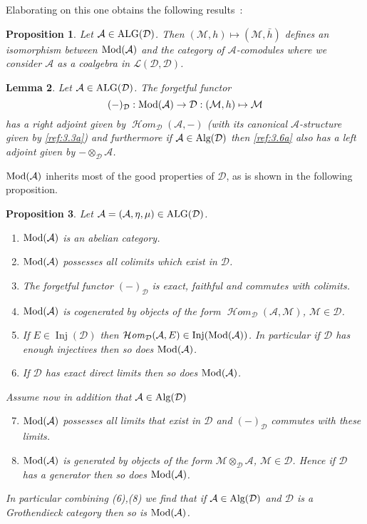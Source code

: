 \documentclass{amsproc}
\def\Ascr{{\mathcal A}}
\def\Dscr{{\mathcal D}}
\def\Hscr{{\mathcal H}}
\def\Lscr{{\mathcal L}}
\def\Mscr{{\mathcal M}}
\def\HHom{\operatorname {\Hscr \mathit{om}}}
\def\Mod{\mathop{\text{Mod}}}
\def\Alg{\mathop{\text{Alg}}}
\def\ALG{\mathop{\text{ALG}}}
\def\Inj{\operatorname {Inj}}
\def\HHom{\operatorname {\Hscr \mathit{om}}}
\def\r{\rightarrow}
\let\oldtext\text
\def\text#1{\oldtext{\upshape #1}}
\newtheorem{lemmas}{Lemma}[subsection]
\newtheorem{propositions}[lemmas]{Proposition}
\theoremstyle{definition}
\theoremstyle{remark}
\numberwithin{equation}{section}
\numberwithin{table}{section}
\numberwithin{figure}{section}
\begin{document}
Elaborating on this one obtains the following results~:
\begin{propositions} Let $\Ascr\in\ALG(\Dscr)$. Then $(\Mscr,h)\mapsto
  (\Mscr,\bar{h})$ defines an isomorphism between $\Mod(\Ascr)$ and
  the category of $\Ascr$-comodules where we consider $\Ascr$  as
  a coalgebra in $\Lscr(\Dscr,\Dscr)$.
\end{propositions}
\begin{lemmas}
\label{ref:3.1.14a}
Let $\Ascr\in \ALG(\Dscr)$. The forgetful functor
\begin{equation}
\label{ref:3.6a}
(-)_\Dscr:\Mod(\Ascr)\r\Dscr:(\Mscr,h)\mapsto \Mscr
\end{equation}
 has a right adjoint given by $\HHom_\Dscr(\Ascr,-)$ (with its
canonical $\Ascr$-structure given by \eqref{ref:3.3a}) and furthermore if
$\Ascr\in\Alg(\Dscr)$ then \eqref{ref:3.6a} also has a left adjoint given by
$-\otimes_\Dscr\Ascr$.
\end{lemmas}
$\Mod(\Ascr)$ inherits most of the good properties of $\Dscr$, as is
shown in the following proposition.
\begin{propositions} 
\label{ref:3.1.15a}
Let $\Ascr=(\Ascr,\eta,\mu) \in \ALG(\Dscr)$.
\begin{enumerate}
\item
$\Mod(\Ascr)$ is an abelian category.
\item
$\Mod(\Ascr)$ possesses all colimits which exist in $\Dscr$.
\item
The forgetful functor $(-)_\Dscr$ is exact, faithful  and commutes with
colimits.
\item
$\Mod(\Ascr)$ is cogenerated by objects of the form
$\HHom_\Dscr(\Ascr,\Mscr)$, $\Mscr\in\Dscr$.
\item If $E\in \Inj(\Dscr)$ then $\HHom_\Dscr(\Ascr,E)\in
  \Inj(\Mod(\Ascr))$. In particular if $\Dscr$ has enough injectives
  then so does $\Mod(\Ascr)$.
\item
If $\Dscr$ has exact direct limits then so does $\Mod(\Ascr)$.
\end{enumerate}
Assume now in addition that $\Ascr\in\Alg(\Dscr)$
\begin{enumerate}
\setcounter{enumi}{6}
\item $\Mod(\Ascr)$ possesses all limits that exist in $\Dscr$ and
  $(-)_\Dscr$ commutes with these limits.
\item
$\Mod(\Ascr)$ is generated by objects of the form
$\Mscr\otimes_\Dscr\Ascr$, $\Mscr\in\Dscr$. Hence if $\Dscr$ has a
generator then so does $\Mod(\Ascr)$.
\end{enumerate}
In particular combining (6),(8) we find that if $\Ascr\in\Alg(\Dscr)$
and $\Dscr$ is a Grothendieck category then so is $\Mod(\Ascr)$.
\end{propositions}
\end{document}
